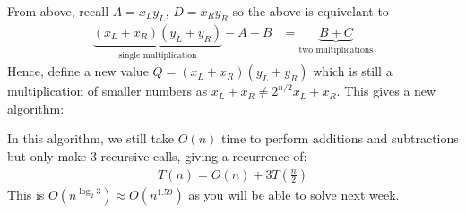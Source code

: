\documentclass[14pt]{extarticle}
\begin{document}
    From above, recall $A = x_Ly_L$, $D = x_Ry_R$ so the above is equivelant
    to
    \begin{align*}
        \underbrace{(x_L + x_R)(y_L + y_R)}_{\text{single multiplication}} 
        - A - B &= \underbrace{B + C}_{\text{two multiplications}}
    \end{align*}
    Hence, define a new value $Q = (x_L + x_R)(y_L + y_R)$ which is still
    a multiplication of smaller numbers as $x_L + x_R \neq 2^{n/2} x_L + x_R$.
    This gives a new algorithm:
    \begin{algorithm}
    \end{algorithm}

    In this algorithm, we still take $O(n)$ time to perform additions and
    subtractions but only make $3$ recursive calls, giving a recurrence of:
    \begin{align*}
        T(n) = O(n) + 3T\left(\frac{n}{2}\right)
    \end{align*}
    This is $O\left(n^{\log_2 3}\right) \approx O\left(n^{1.59}\right)$ as you
    will be able to solve next week.
\end{document}
